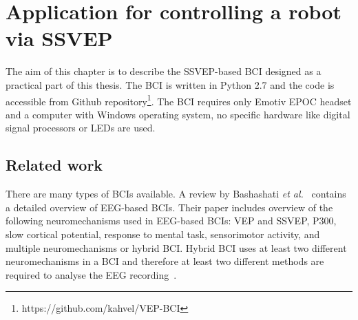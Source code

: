
\chapter{Application for controlling a robot via SSVEP}
\label{sec:SSVEP_BCI}

The aim of this chapter is to describe the \gls{SSVEP}-based \gls{BCI} designed as a practical part of this thesis. The \gls{BCI} is written in Python 2.7 and the code is accessible from Github repository\footnote{https://github.com/kahvel/VEP-BCI}. The \gls{BCI} requires only Emotiv EPOC headset and a computer with Windows operating system, no specific hardware like digital signal processors or \glspl{LED} are used.

\section{Related work}

There are many types of \glspl{BCI} available. A review by Bashashati \textit{et al.}~\cite{bci_comparison} contains a detailed overview of \gls{EEG}-based \glspl{BCI}. Their paper includes overview of the following neuromechanisms used in \gls{EEG}-based \glspl{BCI}: \gls{VEP} and \gls{SSVEP}, P300, slow cortical potential, response to mental task, sensorimotor activity, and multiple neuromechanisms or hybrid \gls{BCI}. Hybrid \gls{BCI} uses at least two different neuromechanisms in a \gls{BCI} and therefore at least two different methods are required to analyse the \gls{EEG} recording~\cite{hybrid_bci, hybrid_bci2}.

